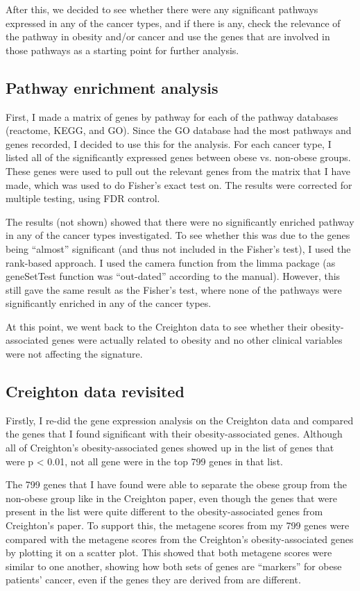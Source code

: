 \documentclass[a4paper, 11pt]{article}
\begin{document}
After this, we decided to see whether there were any significant pathways expressed in any of the cancer types, and if there is any, check the relevance of the pathway in obesity and/or cancer and use the genes that are involved in those pathways as a starting point for further analysis.

\subsection*{Pathway enrichment analysis}

First, I made a matrix of genes by pathway for each of the pathway databases (reactome, KEGG, and GO).
Since the GO database had the most pathways and genes recorded, I decided to use this for the analysis.
For each cancer type, I listed all of the significantly expressed genes between obese vs. non-obese groups.
These genes were used to pull out the relevant genes from the matrix that I have made, which was used to do Fisher's exact test on.
The results were corrected for multiple testing, using FDR control.

The results (not shown) showed that there were  no significantly enriched pathway in any of the cancer types investigated.
To see whether this was due to the genes being ``almost'' significant (and thus not included in the Fisher's test), I used the rank-based approach.
I used the camera function from the limma package (as geneSetTest function was ``out-dated'' according to the manual).
However, this still gave the same result as the Fisher's test, where none of the pathways were significantly enriched in any of the cancer types.

At this point, we went back to the Creighton data to see whether their obesity-associated genes were actually related to obesity and no other clinical variables were not affecting the signature.

\subsection*{Creighton data revisited}

Firstly, I re-did the gene expression analysis on the Creighton data and compared the genes that I found significant with their obesity-associated genes.
Although all of Creighton's obesity-associated genes showed up in the list of genes that were p \textless{} 0.01, not all gene were in the top 799 genes in that list.

The 799 genes that I have found were able to separate the obese group from the non-obese group like in the Creighton paper, even though the genes that were present in the list were quite different to the obesity-associated genes from Creighton's paper.
To support this, the metagene scores from my 799 genes were compared with the metagene scores from the Creighton's obesity-associated genes by plotting it on a scatter plot.
This showed that both metagene scores were similar to one another, showing how both sets of genes are ``markers'' for obese patients' cancer, even if the genes they are derived from are different.
\end{document}
